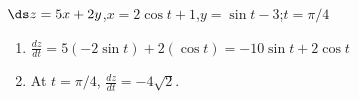 {$\ds z=5x+2y$,\qquad $x=2\cos t+1$,\qquad $y=\sin t-3$;\qquad $t=\pi/4$
}
{\begin{enumerate}
	\item $\frac{dz}{dt} = 5(-2\sin t)+2(\cos t) = -10\sin t+2\cos t$
	
	\item		At $t=\pi/4$, $\frac{dz}{dt} = -4\sqrt{2}$.
\end{enumerate}
}
